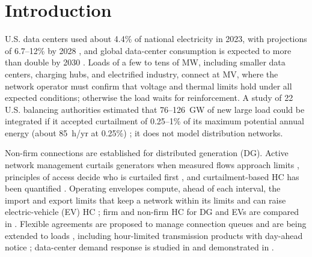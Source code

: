 \documentclass[conference,letterpaper]{IEEEtran}
\begin{document}
\section{Introduction}
U.S. data centers used about 4.4\% of national electricity in 2023, with projections of 6.7--12\% by 2028 \cite{lbnl}, and global data-center consumption is expected to more than double by 2030 \cite{iea}. Loads of a few to tens of MW, including smaller data centers, charging hubs, and electrified industry, connect at MV, where the network operator must confirm that voltage and thermal limits hold under all expected conditions; otherwise the load waits for reinforcement. A study of 22 U.S. balancing authorities estimated that 76--126~GW of new large load could be integrated if it accepted curtailment of 0.25--1\% of its maximum potential annual energy (about 85~h/yr at 0.25\%) \cite{duke,utilitydive2025}; it does not model distribution networks.

Non-firm connections are established for distributed generation (DG). Active network management curtails generators when measured flows approach limits \cite{currie2007}, principles of access decide who is curtailed first \cite{kane2014}, and curtailment-based HC has been quantified \cite{anaya2015,kulmala2017}. Operating envelopes compute, ahead of each interval, the import and export limits that keep a network within its limits \cite{petrou2021,liu2022} and can raise electric-vehicle (EV) HC \cite{fani2024}; firm and non-firm HC for DG and EVs are compared in \cite{zakaria2025}. Flexible agreements are proposed to manage connection queues \cite{desanti2025} and are being extended to loads \cite{doe2024}, including hour-limited transmission products with day-ahead notice \cite{tennet_tdtr}; data-center demand response is studied in \cite{wierman2014} and demonstrated in \cite{colangelo2025}.
\end{document}
